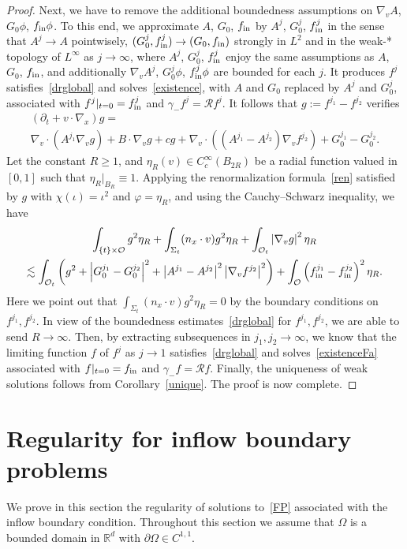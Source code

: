 \documentclass[10pt]{amsart}
\theoremstyle{definition}\newtheorem{defi}[theo]{Definition}\newtheorem{rema}[theo]{Remark}\newtheorem{exam}[theo]{Example}\newtheorem{exem}[theo]{Example}\newtheorem{nota}[theo]{Notation}
\newcommand*\p{\partial}
\newcommand*\fin {f_{\rm in}}
\newcommand*\R {\mathbb{R}}
\newcommand*\RR {\mathcal{R}}
\newcommand*\OO {\mathcal{O}}
\begin{document}
\begin{proof}
Next, we have to remove the additional boundedness assumptions on $\nabla_vA$, $G_0\phi$, $\fin\phi$. To this end, we approximate $A$, $G_0$, $\fin$ by $A^j$, $G_0^j$, $\fin^j$ in the sense that $A^j\rightarrow A$ pointwisely, $(G_0^j,\fin^j)\rightarrow (G_0,\fin)$ strongly in $L^2$ and in the weak-* topology of $L^\infty$ as $j\rightarrow\infty$, where $A^j$, $G_0^j$, $\fin^j$ enjoy the same assumptions as $A$, $G_0$, $\fin$, and additionally $\nabla_vA^j$, $G_0^j\phi$, $\fin^j\phi$ are bounded for each $j$. It produces $f^j$ satisfies~\eqref{drglobal} and solves~\eqref{existence}, with $A$ and $G_0$ replaced by $A^j$ and $G_0^j$, associated with $f^j|_{t=0}=\fin^j$ and $\gamma_-f^j=\RR f^j$. It follows that $g:=f^{j_1}-f^{j_2}$ verifies
\begin{multline*}
\left(\p_t+v\cdot\nabla_x\right)g =\\ \nabla_v\cdot\left(A^{j_1}\nabla_vg\right) +B\cdot\nabla_vg +cg
+ \nabla_v\cdot\left(\left(A^{j_1}-A^{j_2}\right)\nabla_vf^{j_2}\right) +G_0^{j_1}-G_0^{j_2}.
\end{multline*}
Let the constant $R\ge1$, and $\eta_R(v)\in C_c^\infty(B_{2R})$ be a radial function valued in $[0,1]$ such that $\eta_R|_{B_R}\equiv1$. Applying the renormalization formula~\eqref{ren} satisfied by $g$ with $\chi(\iota)=\iota^2$ and $\varphi=\eta_R$, and using the Cauchy--Schwarz inequality, we have
\begin{multline*}
\int_{\{t\}\times\OO} g^2 \eta_R + \int_{\Sigma_t}(n_x\cdot v) g^2\eta_R +\int_{\OO_t}\left|\nabla_vg\right|^2\eta_R\\
\lesssim \int_{\OO_t} \left(g^2+\left|G_0^{j_1}-G_0^{j_2}\right|^2 + \left|A^{j_1}-A^{j_2}\right|^2\left|\nabla_vf^{j_2}\right|^2 \right) + \int_\OO \left(\fin^{j_1}-\fin^{j_2}\right)^2 \eta_R.
\end{multline*}
Here we point out that $\int_{\Sigma_t}(n_x\cdot v) g^2\eta_R=0$ by the boundary conditions on $f^{j_1},f^{j_2}$. In view of the boundedness estimates~\eqref{drglobal} for $f^{j_1},f^{j_2}$, we are able to send $R\rightarrow\infty$. Then, by extracting subsequences in $j_1,j_2\rightarrow\infty$, we know that the limiting function $f$ of $f^j$ as $j\rightarrow1$ satisfies~\eqref{drglobal} and solves~\eqref{existenceFa} associated with $f|_{t=0}=\fin$ and $\gamma_-f=\RR f$. Finally, the uniqueness of weak solutions follows from Corollary~\ref{unique}. The proof is now complete.
\end{proof}

\section{Regularity for inflow boundary problems}\label{inflow}
We prove in this section the regularity of solutions to~\eqref{FP} associated with the inflow boundary condition. Throughout this section we assume that $\Omega$ is a bounded domain in $\R^d$ with $\p\Omega\in C^{1,1}$.
\end{document}

